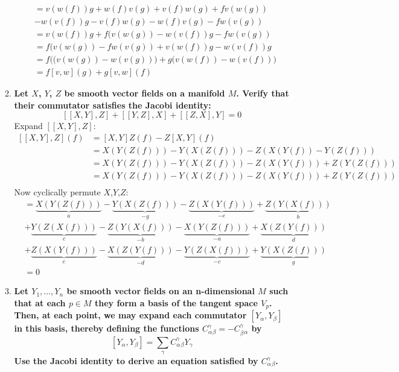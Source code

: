 \documentclass[9pt]{report}
\begin{document}
\begin{enumerate}
\begin{enumerate}
\[\begin{align}
                &= v(w(f))g+w(f)v(g)+v(f)w(g)+fv(w(g))\\
                &-w(v(f))g-v(f)w(g)-w(f)v(g)-fw(v(g))\\
                &= v(w(f))g+f(v(w(g))-w(v(f))g-fw(v(g))\\
                &= f(v(w(g))-fw(v(g))+v(w(f))g-w(v(f))g\\
                &= f\Big((v(w(g))-w(v(g))\Big)+g\Big(v(w(f))-w(v(f))\Big)\\
                &= f[v,w](g)+g[v,w](f)
    \end{align}
  \]
  \item \textbf{Let $X$, $Y$, $Z$ be smooth vector fields on a manifold $M$. Verify
    that their commutator satisfies the Jacobi identity:}
  \[
    [[X,Y],Z] + [[Y,Z],X] + [[Z,X],Y] = 0
  \]
  Expand $[[X,Y],Z]$:
  \[
    \begin{align}
      [[X,Y],Z](f) &= [X,Y]Z(f)-Z[X,Y](f)\\
                   &= X(Y(Z(f)))-Y(X(Z(f)))-Z(X(Y(f))-Y(Z(f))) \\
                   &= X(Y(Z(f)))-Y(X(Z(f)))-Z(X(Y(f)))+Z(Y(Z(f))) \\
                   &= X(Y(Z(f)))-Y(X(Z(f)))-Z(X(Y(f)))+Z(Y(Z(f))) \\
    \end{align}
  \]
  Now cyclically permute $X$,$Y$,$Z$:
  \[
    \begin{align}
                   &= \underbrace{X(Y(Z(f)))}_a-\underbrace{Y(X(Z(f)))}_{-g}-\underbrace{Z(X(Y(f)))}_{-e}+\underbrace{Z(Y(X(f)))}_b \\
                   &+ \underbrace{Y(Z(X(f)))}_c-\underbrace{Z(Y(X(f)))}_{-b}-\underbrace{X(Y(Z(f)))}_{-a}+\underbrace{X(Z(Y(f)))}_d \\
                   &+ \underbrace{Z(X(Y(f)))}_e-\underbrace{X(Z(Y(f)))}_{-d}-\underbrace{Y(Z(X(f)))}_{-c}+\underbrace{Y(X(Z(f)))}_g \\
                   &= 0
    \end{align}
  \]
\item \textbf{Let $Y_1,\ldots,Y_n$ be smooth vector fields on an n-dimensional
  $M$ such that at each $p\in M$ they form a basis of the tangent space $V_p$.
Then, at each point, we may expand each commutator $[Y_\alpha, Y_\beta]$ in
this basis, thereby defining the functions $C^\gamma_\alpha_\beta=-C^\gamma_\beta_\alpha$ by}
\[
  [Y_\alpha, Y_\beta] = \sum_\gamma C^\gamma_\alpha_\beta Y_\gamma
\]
  \textbf{Use the Jacobi identity to derive an equation satisfied by $C^\gamma_\alpha_\beta$.}\\\\

\end{enumerate}
\end{enumerate}
\end{document}
